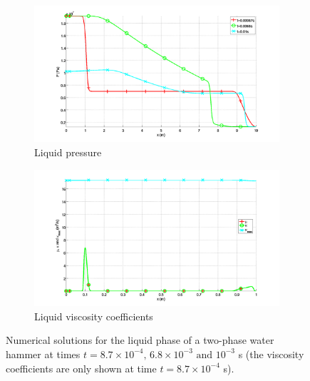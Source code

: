 \documentclass{mc2015}
\begin{document}
\begin{figure}[H]
        \begin{subfigure}[b]{0.495\textwidth}
                \centering
                \includegraphics[width=\textwidth]{figures/Plot_pressure_liquid_phase.png}
                \caption{Liquid pressure}
                \label{fig:liq-phase-press}
        \end{subfigure}        
        \begin{subfigure}[b]{0.495\textwidth}
                \centering
                \includegraphics[width=\textwidth]{figures/Plot_viscosity_liquid_phase.png}
                \caption{Liquid viscosity coefficients}
                \label{ffig:liq-phase-visc}
        \end{subfigure}
        \caption{Numerical solutions for the liquid phase of a two-phase water hammer at times $t=8.7 \times 10^{-4}, \, 6.8 \times 10^{-3} \text{ and } 10^{-3}$ s (the viscosity coefficients are only shown at time $t=8.7 \times 10^{-4}$ s).}\label{fig:liquid-phase}
\end{figure}
%
%
\end{document}
